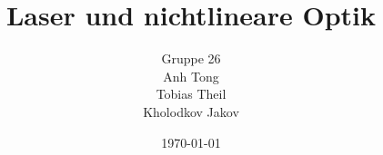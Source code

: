 \documentclass[11pt,a4paper]{scrartcl}
\title{Laser und nichtlineare Optik}
\author{Gruppe 26\\ Anh Tong \\ Tobias Theil \\ Kholodkov Jakov }
\date{\today}
\begin{document}
	
\maketitle
\tableofcontents



\newpage







\begin{appendix}

\end{appendix}
 
\end{document}
